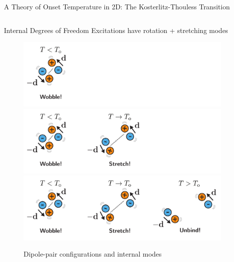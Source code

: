 \begin{frame}{A Theory of Onset Temperature in 2D: The Kosterlitz-Thouless Transition}

\begin{columns}[T]
\begin{column}[T]{0.5\textwidth}

\begin{block}{\centering \large Internal Degrees of Freedom}
Excitations have rotation + stretching modes
\end{block}

\begin{figure}
\begin{overprint}
\centering\includegraphics[width=0.85\linewidth]{c.6-kt_energyentropy/dofs_quadrupole-0.pdf}
\centering\includegraphics[width=0.85\linewidth]{c.6-kt_energyentropy/dofs_quadrupole-1.pdf}
\centering\includegraphics[width=0.85\linewidth]{c.6-kt_energyentropy/dofs_quadrupole-3.pdf}
\end{overprint}
\caption{Dipole-pair configurations and internal modes}
\end{figure}

\end{column}

\begin{column}[T]{0.5\textwidth}


\end{column}
\end{columns}
\end{frame}

